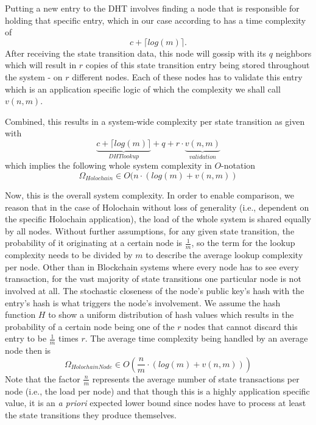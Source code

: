 \documentclass[twocolumn,showpacs,
  nofootinbib,aps,superscriptaddress,
  eqsecnum,prd,notitlepage,showkeys,10pt]{revtex4-1}
\begin{document}
Putting a new entry to the DHT involves finding a node that is responsible for holding that specific entry, which in our case according to \cite{kademlia} has a time complexity of \begin{equation}
c+\lceil{log(m)}\rceil.
\end{equation}
After receiving the state transition data, this node will gossip with its $q$ neighbors which will result in $r$ copies of this state transition entry being stored throughout the system - on $r$ different nodes. Each of these nodes has to validate this entry which is an application specific logic of which the complexity we shall call $v(n, m)$.

Combined, this results in a system-wide complexity per state transition as given with
\begin{equation}
\underbrace{c+\lceil{log(m)}\rceil}_{DHT lookup}
+ q + r \cdot
\underbrace{v(n,m)}_{validation}
\end{equation}
which implies the following whole system complexity in $O$-notation
\begin{equation}
\Omega_{Holochain} \in O(n\cdot(log(m) + v(n,m))
\end{equation}

Now, this is the overall system complexity. In order to enable comparison, we reason that in the case of Holochain without loss of generality (i.e., dependent on the specific Holochain application), the load of the whole system is shared equally by all nodes. Without further assumptions, for any given state transition, the probability of it originating at a certain node is $\frac{1}{m}$, so the term for the lookup complexity needs to be divided by $m$ to  describe the average lookup complexity per node. Other than in Blockchain systems where every node has to see every transaction, for the vast majority of state transitions one particular node is not involved at all. The stochastic closeness of the node's public key's hash with the entry's hash is what triggers the node's involvement. We assume the hash function $H$ to show a uniform distribution of hash values which results in the probability of a certain node being one of the $r$ nodes that cannot discard this entry to be $\frac{1}{m}$ times $r$.  The average time complexity being handled by an average node then is
\begin{equation}
\Omega_{HolochainNode} \in
O\left(\frac{n}{m}\cdot\left(log(m) + v(n,m)\right)\right)
\end{equation}
Note that the factor $\frac{n}{m}$ represents the average number of state transactions per node (i.e., the load per node) and that though this is a highly application specific value, it is an \textit{a priori }expected lower bound since nodes have to process at least the state transitions they produce themselves.
\end{document}
